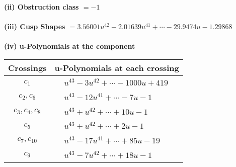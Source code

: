 \documentclass[1p]{elsarticle_modified}
\theoremstyle{definition}
\begin{document}
\flushleft \textbf{(ii) Obstruction class $= -1$}\\~\\
\flushleft \textbf{(iii) Cusp Shapes $= 3.56001 u^{42}-2.01639 u^{41}+\cdots-29.9474 u-1.29868$}\\~\\
\newpage\renewcommand{\arraystretch}{1}
\flushleft \textbf{(iv) u-Polynomials at the component}\newline \\
\begin{tabular}{m{50pt}|m{274pt}}
Crossings & \hspace{64pt}u-Polynomials at each crossing \\
\hline $$\begin{aligned}c_{1}\end{aligned}$$&$\begin{aligned}
&u^{43}-3 u^{42}+\cdots-1000 u+419
\end{aligned}$\\
\hline $$\begin{aligned}c_{2},c_{6}\end{aligned}$$&$\begin{aligned}
&u^{43}-12 u^{41}+\cdots-7 u-1
\end{aligned}$\\
\hline $$\begin{aligned}c_{3},c_{4},c_{8}\end{aligned}$$&$\begin{aligned}
&u^{43}+u^{42}+\cdots+10 u-1
\end{aligned}$\\
\hline $$\begin{aligned}c_{5}\end{aligned}$$&$\begin{aligned}
&u^{43}+u^{42}+\cdots+2 u-1
\end{aligned}$\\
\hline $$\begin{aligned}c_{7},c_{10}\end{aligned}$$&$\begin{aligned}
&u^{43}-17 u^{41}+\cdots+85 u-19
\end{aligned}$\\
\hline $$\begin{aligned}c_{9}\end{aligned}$$&$\begin{aligned}
&u^{43}-7 u^{42}+\cdots+18 u-1
\end{aligned}$\\
\hline
\end{tabular}\\~\\
\end{document}
